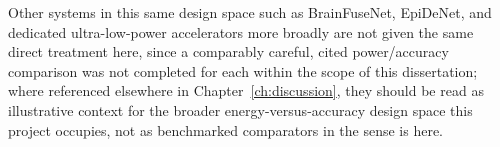 Other systems in this same design space such as BrainFuseNet, EpiDeNet, and dedicated ultra-low-power accelerators more broadly are not given the same direct treatment here, since a 
comparably careful, cited power/accuracy comparison was not completed for each within the scope of this dissertation; where referenced elsewhere in Chapter~\ref{ch:discussion}, they 
should be read as illustrative context for the broader energy-versus-accuracy design space this project occupies, not as benchmarked comparators in the sense \citet{li2024xylo} is here.